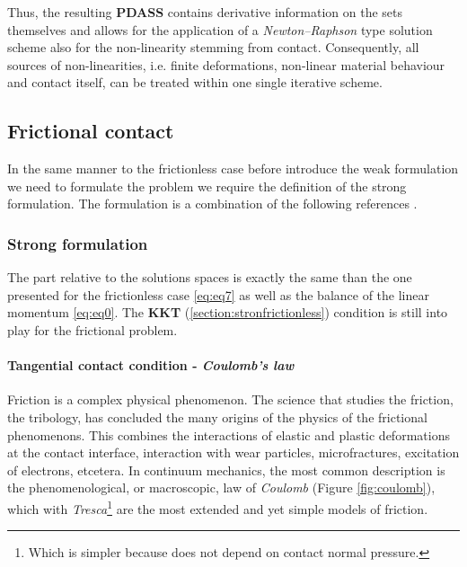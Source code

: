 \documentclass[a4paper,10pt]{article} %
\begin{document}
Thus, the resulting \textbf{PDASS} contains derivative information on the sets themselves and allows for the application of a \textit{Newton–Raphson} type solution scheme also for the non-linearity stemming from contact. Consequently, all sources of non-linearities, i.e. finite deformations, non-linear material behaviour and contact itself, can be treated
within one single iterative scheme.

\subsection{Frictional contact}

In the same manner to the frictionless case before introduce the weak formulation we need to formulate the problem we require the definition of the strong formulation. The formulation is a combination of the following references \cite{cardona3, gitt1, doca1, doca2, laursen2}.

\subsubsection{Strong formulation}

The part relative to the solutions spaces is exactly the same than the one presented for the frictionless case \eqref{eq:eq7} as well as the balance of the linear momentum \eqref{eq:eq0}. The \textbf{KKT} (\ref{section:stronfrictionless}) condition is still into play for the frictional problem.

\paragraph{Tangential contact condition - \textit{Coulomb's law}}

Friction is a complex physical phenomenon. The science that studies the friction, the tribology, has concluded the many origins of the physics of the frictional phenomenons. This combines the interactions of elastic and plastic deformations at the contact interface, interaction with wear particles, microfractures, excitation of electrons, etcetera. In continuum mechanics, the most common description is the phenomenological, or macroscopic, law of \textit{Coulomb} (Figure \ref{fig:coulomb}), which with \textit{Tresca}\footnote{Which is simpler because does not depend on contact normal pressure.} are the most extended and yet simple models of friction.
\end{document}
